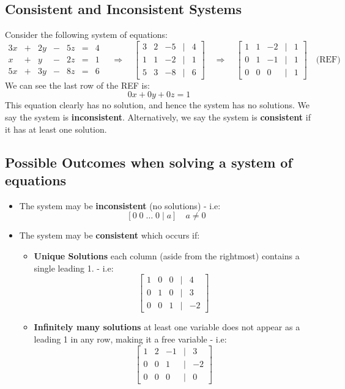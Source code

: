 \documentclass[a4paper, 9pt]{extarticle}
\begin{document}
\subsection{Consistent and Inconsistent Systems}
Consider the following system of equations:
$$
  \begin{array}{ccccccc}
    3x & + & 2y & - & 5z & = & 4 \\
    x  & + & y  & - & 2z & = & 1 \\
    5x & + & 3y & - & 8z & = & 6
  \end{array}
  \quad \Rightarrow \quad
  \begin{bmatrix}
    3 & 2 & -5 & | & 4 \\
    1 & 1 & -2 & | & 1 \\
    5 & 3 & -8 & | & 6
  \end{bmatrix}
  \quad \Rightarrow \quad
  \begin{bmatrix}
    1 & 1 & -2 & | & 1 \\
    0 & 1 & -1 & | & 1 \\
    0 & 0 & 0  & | & 1
  \end{bmatrix} \quad \text{(REF)}
$$
We can see the last row of the REF is:
$$
  0x + 0y + 0z = 1
$$
This equation clearly has no solution, and hence the system has no solutions. We say the system is \textbf{inconsistent}. Alternatively, we say the system is \textbf{consistent} if it has at least one solution.
\subsection{Possible Outcomes when solving a system of equations}
\begin{itemize}
  \item The system may be \textbf{inconsistent} (no solutions) - i.e:
        $$ [0 \; 0 \; \dots \; 0 \; | \; a] \quad a \neq 0$$
  \item The system may be \textbf{consistent} which occurs if:
        \begin{itemize}
          \item \textbf{Unique Solutions} each column (aside from the rightmost) contains a single leading 1. - i.e:
                $$
                  \begin{bmatrix}
                    1 & 0 & 0 & | & 4  \\
                    0 & 1 & 0 & | & 3  \\
                    0 & 0 & 1 & | & -2
                  \end{bmatrix}
                $$

          \item \textbf{Infinitely many solutions} at least one variable does not appear as a leading 1 in any row, making it a free variable - i.e:
                $$
                  \begin{bmatrix}
                    1 & 2 & -1 & | & 3  \\
                    0 & 0 & 1  & | & -2 \\
                    0 & 0 & 0  & | & 0
                  \end{bmatrix}
                $$
        \end{itemize}
\end{itemize}
\end{document}
